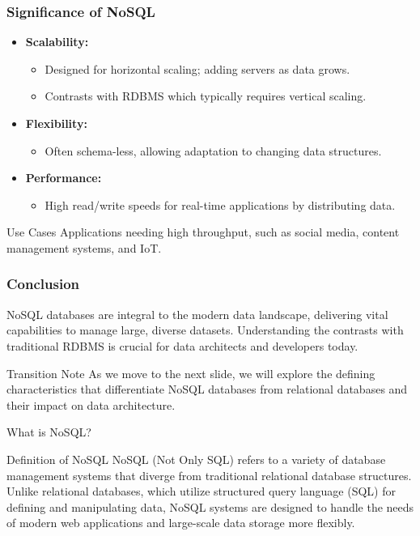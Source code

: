 \documentclass[aspectratio=169]{beamer}
\begin{document}
\begin{frame}[fragile]
    \frametitle{Significance of NoSQL}
    \begin{itemize}
        \item \textbf{Scalability:} 
        \begin{itemize}
            \item Designed for horizontal scaling; adding servers as data grows.
            \item Contrasts with RDBMS which typically requires vertical scaling.
        \end{itemize}
        \item \textbf{Flexibility:}
        \begin{itemize}
            \item Often schema-less, allowing adaptation to changing data structures.
        \end{itemize}
        \item \textbf{Performance:}
        \begin{itemize}
            \item High read/write speeds for real-time applications by distributing data.
        \end{itemize}
    \end{itemize}
    \begin{block}{Use Cases}
        Applications needing high throughput, such as social media, content management systems, and IoT.
    \end{block}
\end{frame}

\begin{frame}[fragile]
    \frametitle{Conclusion}
    NoSQL databases are integral to the modern data landscape, delivering vital capabilities to manage large, diverse datasets. Understanding the contrasts with traditional RDBMS is crucial for data architects and developers today.
    \begin{block}{Transition Note}
        As we move to the next slide, we will explore the defining characteristics that differentiate NoSQL databases from relational databases and their impact on data architecture.
    \end{block}
\end{frame}

\begin{frame}[fragile]{What is NoSQL?}
    \begin{block}{Definition of NoSQL}
        NoSQL (Not Only SQL) refers to a variety of database management systems that diverge from traditional relational database structures. Unlike relational databases, which utilize structured query language (SQL) for defining and manipulating data, NoSQL systems are designed to handle the needs of modern web applications and large-scale data storage more flexibly.
    \end{block}
\end{frame}
\end{document}
